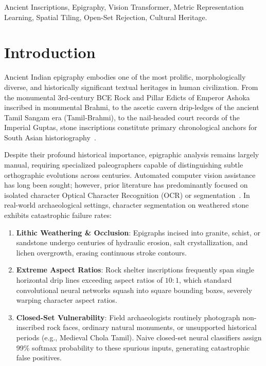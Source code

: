 \documentclass[conference,10pt]{IEEEtran}
\begin{document}
\begin{IEEEkeywords}
Ancient Inscriptions, Epigraphy, Vision Transformer, Metric Representation Learning, Spatial Tiling, Open-Set Rejection, Cultural Heritage.
\end{IEEEkeywords}

\section{Introduction}
Ancient Indian epigraphy embodies one of the most prolific, morphologically diverse, and historically significant textual heritages in human civilization. From the monumental 3rd-century BCE Rock and Pillar Edicts of Emperor Ashoka inscribed in monumental Brahmi, to the ascetic cavern drip-ledges of the ancient Tamil Sangam era (Tamil-Brahmi), to the nail-headed court records of the Imperial Guptas, stone inscriptions constitute primary chronological anchors for South Asian historiography~\cite{salomon1998indian,sircar1965indian}.

Despite their profound historical importance, epigraphic analysis remains largely manual, requiring specialized paleographers capable of distinguishing subtle orthographic evolutions across centuries. Automated computer vision assistance has long been sought; however, prior literature has predominantly focused on isolated character Optical Character Recognition (OCR) or segmentation~\cite{uchida2013text,diem2014recognizing}. In real-world archaeological settings, character segmentation on weathered stone exhibits catastrophic failure rates:
\begin{enumerate}
    \item \textbf{Lithic Weathering \& Occlusion}: Epigraphs incised into granite, schist, or sandstone undergo centuries of hydraulic erosion, salt crystallization, and lichen overgrowth, erasing continuous stroke contours.
    \item \textbf{Extreme Aspect Ratios}: Rock shelter inscriptions frequently span single horizontal drip lines exceeding aspect ratios of $10:1$, which standard convolutional neural networks squash into square bounding boxes, severely warping character aspect ratios.
    \item \textbf{Closed-Set Vulnerability}: Field archaeologists routinely photograph non-inscribed rock faces, ordinary natural monuments, or unsupported historical periods (e.g., Medieval Chola Tamil). Naive closed-set neural classifiers assign 99\% softmax probability to these spurious inputs, generating catastrophic false positives.
\end{enumerate}
\end{document}
